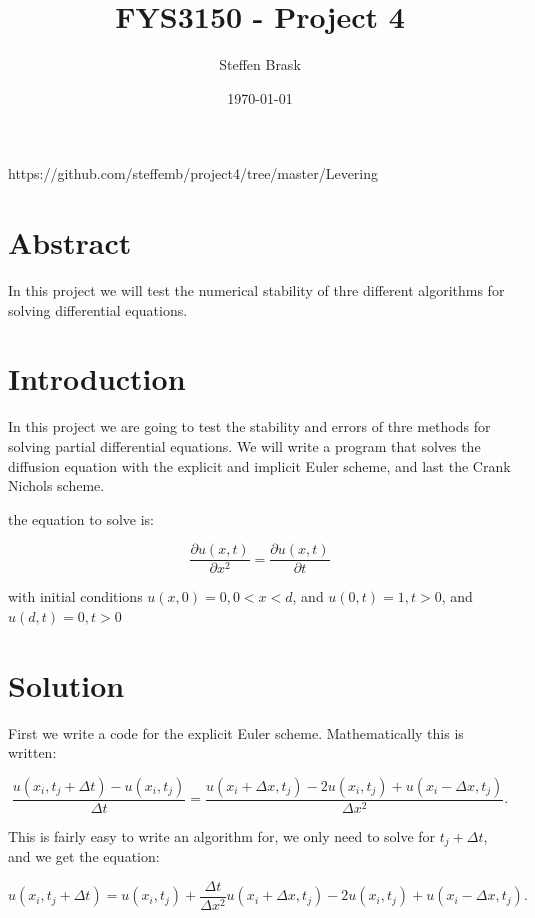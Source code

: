 \documentclass[norsk,a4paper,12pt]{article}
\title{FYS3150 - Project 4}
\author{Steffen Brask}
\date{\today}
\begin{document}
\maketitle

\begin{center}
https://github.com/steffemb/project4/tree/master/Levering
\end{center}


\newpage


\section*{Abstract}

In this project we will test the numerical stability of thre different algorithms for solving differential equations.

\section*{Introduction}

In this project we are going to test the stability and errors of thre methods for solving partial differential equations.
We will write a program that solves the diffusion equation with the explicit and implicit Euler scheme, and last the Crank Nichols scheme.

the equation to solve is:

\begin{equation}
 \frac{\partial u(x,t)}{\partial x^2} = \frac{\partial u(x,t)}{\partial t}
\end{equation}

with initial conditions $u(x,0) = 0, 0<x<d$, and $u(0,t) = 1, t>0$, and $u(d,t) = 0, t>0$


\section*{Solution}

First we write a code for the explicit Euler scheme. Mathematically this is written:

\begin{equation}
 \frac{u(x_i,t_j+\Delta t)-u(x_i,t_j)}{\Delta t} = \frac{u(x_i+\Delta x,t_j)-2u(x_i,t_j)+u(x_i-\Delta x,t_j)}{\Delta x^2}.
\end{equation}

This is fairly easy to write an algorithm for, we only need to solve for $t_j + \Delta t$, and we get the equation:

\begin{equation}
 u(x_i,t_j+\Delta t) = u(x_i,t_j) + \frac{\Delta t}{\Delta x^2} u(x_i+\Delta x,t_j)-2u(x_i,t_j)+u(x_i-\Delta x,t_j).
\end{equation}
\end{document}
